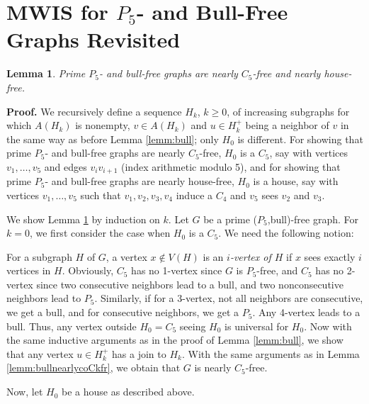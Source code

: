 \documentclass[11pt]{article}
\newcommand{\0}{\text{ has a co-join to }}
\newcommand{\1}{\text{ has a join to }}
\newtheorem{lemm}{Lemma}
\begin{document}
\section{MWIS for $P_5$- and Bull-Free Graphs Revisited}\label{P5bullfr}

\begin{lemm}\label{lemm:bullnearlyC5housefr}
Prime $P_5$- and bull-free graphs are nearly $C_5$-free and nearly house-free.
\end{lemm}
 
\noindent 
{\bf Proof.}
We recursively define a sequence $H_k$, $k \ge 0$, of increasing subgraphs for which $A(H_k)$ is nonempty, $v \in A(H_k)$ and $u \in H^+_k$ being a neighbor of $v$ in the same way as before Lemma \ref{lemm:bull}; only $H_0$ is different. For showing that prime $P_5$- and bull-free graphs are nearly $C_5$-free, $H_0$ is a $C_5$, say with vertices $v_1,\ldots,v_5$ and edges $v_iv_{i+1}$ (index arithmetic modulo 5), and for showing that prime $P_5$- and bull-free graphs are nearly house-free, $H_0$ is a house, say with vertices $v_1,\ldots,v_5$ such that $v_1,v_2,v_3,v_4$ induce a $C_4$ and $v_5$ sees $v_2$ and $v_3$. 
  
We show Lemma \ref{lemm:bullnearlyC5housefr} by induction on $k$. Let $G$ be a prime ($P_5$,bull)-free graph. For $k=0$, we first consider the case when $H_0$ is a $C_5$. We need the following notion: 

For a subgraph $H$ of $G$, a vertex $x \notin V(H)$ is an {\em $i$-vertex of $H$} if $x$ sees exactly $i$ vertices in $H$. Obviously, $C_5$ has no 1-vertex since $G$ is $P_5$-free, and $C_5$ has no 2-vertex since two consecutive neighbors lead to a bull, and two nonconsecutive neighbors lead to $P_5$. Similarly, if for a 3-vertex, not all neighbors are consecutive, we get a bull, and for consecutive neighbors, we get a $P_5$. Any 4-vertex leads to a bull. Thus, any vertex outside $H_0=C_5$ seeing $H_0$ is universal for $H_0$. Now with the same inductive arguments as in the proof of Lemma \ref{lemm:bull},
we show that any vertex $u \in H_k^+$ has a join to $H_k$. With the same arguments as in Lemma \ref{lemm:bullnearlycoCkfr}, we obtain that $G$ is nearly $C_5$-free. 

\medskip
Now, let $H_0$ be a house as described above.  
\end{document}

